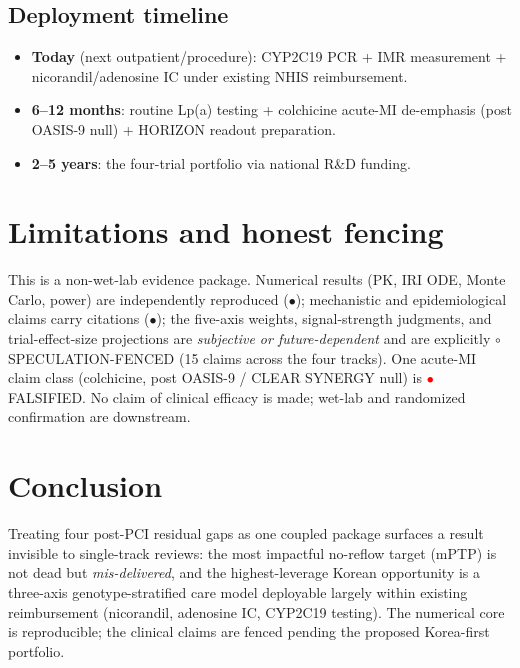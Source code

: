 \documentclass[11pt]{article}
\begin{document}
\subsection{Deployment timeline}
\begin{itemize}
  \item \textbf{Today} (next outpatient/procedure): CYP2C19 PCR + IMR measurement + nicorandil/adenosine IC under existing NHIS reimbursement.
  \item \textbf{6--12 months}: routine Lp(a) testing + colchicine acute-MI de-emphasis (post OASIS-9 null) + HORIZON readout preparation.
  \item \textbf{2--5 years}: the four-trial portfolio via national R\&D funding.
\end{itemize}

\section{Limitations and honest fencing}
\label{sec:limits}

This is a non-wet-lab evidence package. Numerical results (PK, IRI ODE, Monte Carlo, power) are independently reproduced (\textcolor{green!60!black}{$\bullet$}); mechanistic and epidemiological claims carry citations (\textcolor{yellow!70!black}{$\bullet$}); the five-axis weights, signal-strength judgments, and trial-effect-size projections are \emph{subjective or future-dependent} and are explicitly $\circ$\,SPECULATION-FENCED (15 claims across the four tracks). One acute-MI claim class (colchicine, post OASIS-9 / CLEAR SYNERGY null) is \textcolor{red}{$\bullet$}\,FALSIFIED. No claim of clinical efficacy is made; wet-lab and randomized confirmation are downstream.

\section{Conclusion}
\label{sec:conclusion}

Treating four post-PCI residual gaps as one coupled package surfaces a result invisible to single-track reviews: the most impactful no-reflow target (mPTP) is not dead but \emph{mis-delivered}, and the highest-leverage Korean opportunity is a three-axis genotype-stratified care model deployable largely within existing reimbursement (nicorandil, adenosine IC, CYP2C19 testing). The numerical core is reproducible; the clinical claims are fenced pending the proposed Korea-first portfolio.
\end{document}
